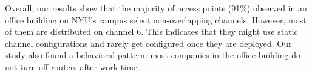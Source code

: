 Overall, our results show that the majority of access points (91\%) observed in an office building on NYU's campus select non-overlapping channels. However, most of them are distributed on channel 6. This indicates that they might use static channel configurations and rarely get configured once they are deployed. Our study also found a behavioral pattern: most companies in the office building do not turn off routers after work time.   